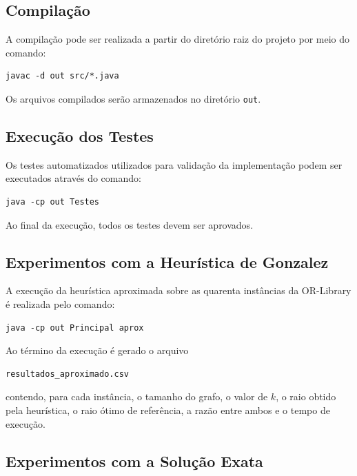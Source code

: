 \documentclass[12pt]{article}
\begin{document}
\subsection{Compilação}

A compilação pode ser realizada a partir do diretório raiz do projeto por meio do comando:

\begin{verbatim}
javac -d out src/*.java
\end{verbatim}

Os arquivos compilados serão armazenados no diretório \texttt{out}.

\subsection{Execução dos Testes}

Os testes automatizados utilizados para validação da implementação podem ser executados através do comando:

\begin{verbatim}
java -cp out Testes
\end{verbatim}

Ao final da execução, todos os testes devem ser aprovados.

\subsection{Experimentos com a Heurística de Gonzalez}

A execução da heurística aproximada sobre as quarenta instâncias da OR-Library é realizada pelo comando:

\begin{verbatim}
java -cp out Principal aprox
\end{verbatim}

Ao término da execução é gerado o arquivo

\begin{verbatim}
resultados_aproximado.csv
\end{verbatim}

contendo, para cada instância, o tamanho do grafo, o valor de $k$, o raio obtido pela heurística, o raio ótimo de referência, a razão entre ambos e o tempo de execução.

\subsection{Experimentos com a Solução Exata}
\end{document}
